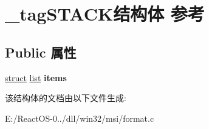 \hypertarget{struct__tag_s_t_a_c_k}{}\section{\+\_\+tag\+S\+T\+A\+C\+K结构体 参考}
\label{struct__tag_s_t_a_c_k}
\subsection*{Public 属性}
\begin{DoxyCompactItemize}
\item 
\mbox{\label{struct__tag_s_t_a_c_k_a1f82db4348778035224c677fc46d9547}} 
\hyperlink{interfacestruct}{struct} \hyperlink{classlist}{list} {\bfseries items}
\end{DoxyCompactItemize}


该结构体的文档由以下文件生成\+:\begin{DoxyCompactItemize}
\item 
E\+:/\+React\+O\+S-\/0../dll/win32/msi/format.\+c\end{DoxyCompactItemize}
